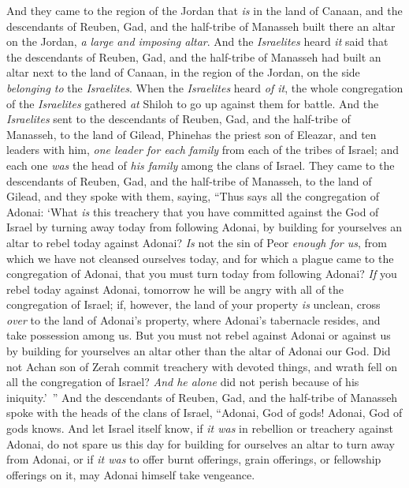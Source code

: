 \begin{biblechapter}
\verse And they came to the region of the Jordan that \textit{is} in the land of Canaan, and the descendants of Reuben, Gad, and the half-tribe of Manasseh built there an altar on the Jordan, \textit{a large and imposing altar}.
\verse And the \textit{Israelites} heard \textit{it} said that the descendants of Reuben, Gad, and the half-tribe of Manasseh had built an altar next to the land of Canaan, in the region of the Jordan, on the side \textit{belonging to} the \textit{Israelites}.
\verse When the \textit{Israelites} heard \textit{of it}, the whole congregation of the \textit{Israelites} gathered \textit{at} Shiloh to go up against them for battle.
\verse And the \textit{Israelites} sent to the descendants of Reuben, Gad, and the half-tribe of Manasseh, to the land of Gilead, Phinehas the priest son of Eleazar,
\verse and ten leaders with him, \textit{one leader for each} \textit{family} from each of the tribes of Israel; and each one \textit{was} the head of \textit{his family} among the clans of Israel.
\verse They came to the descendants of Reuben, Gad, and the half-tribe of Manasseh, to the land of Gilead, and they spoke with them, saying,
\verse “Thus says all the congregation of Adonai: ‘What \textit{is} this treachery that you have committed against the God of Israel by turning away today from following Adonai, by building for yourselves an altar to rebel today against Adonai?
\verse \textit{Is} not the sin of Peor \textit{enough for us}, from which we have not cleansed ourselves today, and for which a plague came to the congregation of Adonai,
\verse that you must turn today from following Adonai? \textit{If} you rebel today against Adonai, tomorrow he will be angry with all of the congregation of Israel;
\verse if, however, the land of your property \textit{is} unclean, cross \textit{over} to the land of Adonai’s property, where Adonai’s tabernacle resides, and take possession among us. But you must not rebel against Adonai or against us by building for yourselves an altar other than the altar of Adonai our God.
\verse Did not Achan son of Zerah commit treachery with devoted things, and wrath fell on all the congregation of Israel? \textit{And he alone} did not perish because of his iniquity.’ ”
\verse And the descendants of Reuben, Gad, and the half-tribe of Manasseh spoke with the heads of the clans of Israel,
\verse “Adonai, God of gods! Adonai, God of gods knows. And let Israel itself know, if \textit{it was} in rebellion or treachery against Adonai, do not spare us this day
\verse for building for ourselves an altar to turn away from Adonai, or if \textit{it was} to offer burnt offerings, grain offerings, or fellowship offerings on it, may Adonai himself take vengeance.

\end{biblechapter}
